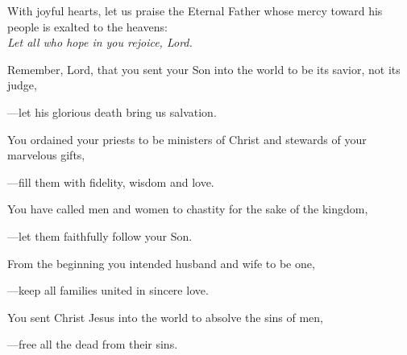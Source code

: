 \intercessions\indent

\begin{hangpar}

With joyful hearts, let us praise the Eternal Father whose mercy toward his people is exalted to the heavens:\\
\emph{Let all who hope in you rejoice, Lord.}

\medskip Remember, Lord, that you sent your Son into the world to be its savior, not its judge,

{\color{red}---\thinspace}let his glorious death bring us salvation.

\medskip You ordained your priests to be ministers of Christ and stewards of your marvelous gifts,

{\color{red}---\thinspace}fill them with fidelity, wisdom and love.

\medskip You have called men and women to chastity for the sake of the kingdom,

{\color{red}---\thinspace}let them faithfully follow your Son.

\medskip From the beginning you intended husband and wife to be one,

{\color{red}---\thinspace}keep all families united in sincere love.

\medskip You sent Christ Jesus into the world to absolve the sins of men,

{\color{red}---\thinspace}free all the dead from their sins.

\end{hangpar}

